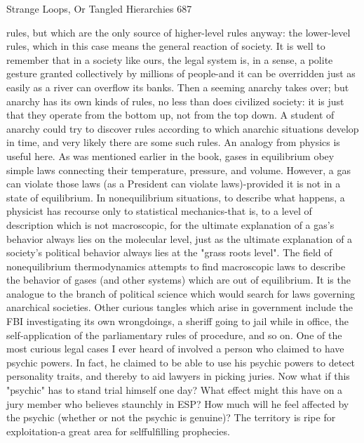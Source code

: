 Strange Loops, Or Tangled Hierarchies                                                   687

rules, but which are the only source of higher-level rules anyway: the lower-level rules,
which in this case means the general reaction of society. It is well to remember that in a
society like ours, the legal system is, in a sense, a polite gesture granted collectively by
millions of people-and it can be overridden just as easily as a river can overflow its
banks. Then a seeming anarchy takes over; but anarchy has its own kinds of rules, no less
than does civilized society: it is just that they operate from the bottom up, not from the
top down. A student of anarchy could try to discover rules according to which anarchic
situations develop in time, and very likely there are some such rules.
         An analogy from physics is useful here. As was mentioned earlier in the book,
gases in equilibrium obey simple laws connecting their temperature, pressure, and
volume. However, a gas can violate those laws (as a President can violate laws)-provided
it is not in a state of equilibrium. In nonequilibrium situations, to describe what happens,
a physicist has recourse only to statistical mechanics-that is, to a level of description
which is not macroscopic, for the ultimate explanation of a gas's behavior always lies on
the molecular level, just as the ultimate explanation of a society's political behavior
always lies at the "grass roots level". The field of nonequilibrium thermodynamics
attempts to find macroscopic laws to describe the behavior of gases (and other systems)
which are out of equilibrium. It is the analogue to the branch of political science which
would search for laws governing anarchical societies.
         Other curious tangles which arise in government include the FBI investigating its
own wrongdoings, a sheriff going to jail while in office, the self-application of the
parliamentary rules of procedure, and so on. One of the most curious legal cases I ever
heard of involved a person who claimed to have psychic powers. In fact, he claimed to be
able to use his psychic powers to detect personality traits, and thereby to aid lawyers in
picking juries. Now what if this "psychic" has to stand trial himself one day? What effect
might this have on a jury member who believes staunchly in ESP? How much will he feel
affected by the psychic (whether or not the psychic is genuine)? The territory is ripe for
exploitation-a great area for selffulfilling prophecies.

